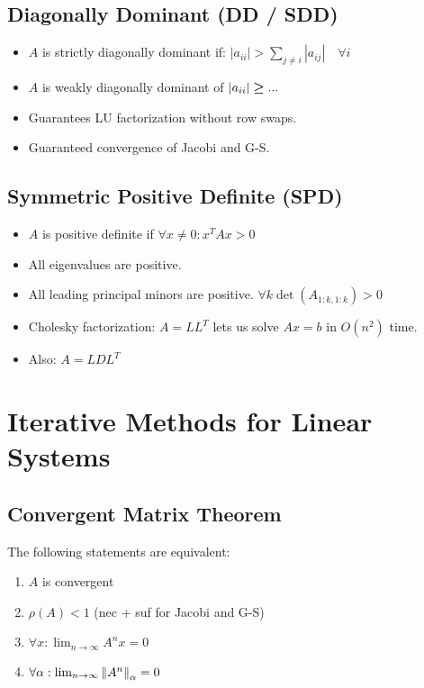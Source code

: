 \documentclass[9pt, letterpaper]{extarticle}
\begin{document}
\begin{multicols*}{3}
  \subsection{Diagonally Dominant (DD / SDD)}
  \begin{itemize}
    \item $ A $ is strictly diagonally dominant if: \newline
      $\displaystyle|a_{ii}| > \sum_{j \ne i} |a_{ij}| \quad \forall i$
    \item $A$ is weakly diagonally dominant of $\abs{a_{ii}} \boldsymbol{\geq} ...$
    \item Guarantees LU factorization without row swaps.
    \item Guaranteed convergence of Jacobi and G-S.
  \end{itemize}

  \subsection{Symmetric Positive Definite (SPD)}
  \begin{itemize}
    \item $ A $ is positive definite if
      $\forall x \ne 0 : x^T A x > 0$
    \item All eigenvalues are positive.
    \item All leading principal minors are positive. $\forall k\det(A_{1:k, 1:k}) > 0$
    \item Cholesky factorization: $A = LL^T$ lets us solve $Ax=b$ in $O(n^2)$
      time.
    \item Also: $A = LDL^T$
  \end{itemize}

  \section{Iterative Methods for Linear Systems}

  \subsection{Convergent Matrix Theorem}
  The following statements are equivalent:
  \begin{enumerate}[label=(\roman*)]
    \item $A$ is convergent
    \item $\rho(A) < 1$ (nec + suf for Jacobi and G-S)
    \item $\forall x: \lim_{n \to \infty} A^nx = 0$
    \item $\forall \alpha: \lim_{n\to\infty} \norm{A^n}_\alpha = 0$
  \end{enumerate}


\end{multicols*}
\end{document}
